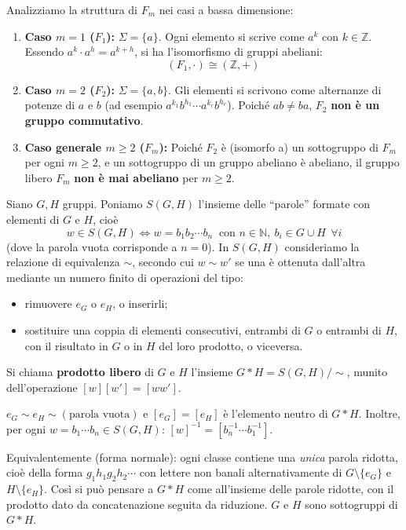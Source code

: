 \begin{observacion}
Analizziamo la struttura di $F_m$ nei casi a bassa dimensione:
\begin{enumerate}
    \item \textbf{Caso $m=1$ ($F_1$):} $\Sigma = \{a\}$. Ogni elemento si scrive come $a^k$ con $k \in \mathbb{Z}$.
    Essendo $a^k \cdot a^h = a^{k+h}$, si ha l'isomorfismo di gruppi abeliani:
    \[
    (F_1, \cdot) \cong (\mathbb{Z}, +)
    \]
    
    \item \textbf{Caso $m=2$ ($F_2$):} $\Sigma = \{a, b\}$. Gli elementi si scrivono come alternanze di potenze di $a$ e $b$ (ad esempio $a^{k_1} b^{h_1} \cdots a^{k_r} b^{h_r}$).
    Poiché $ab \neq ba$, $F_2$ \textbf{non è un gruppo commutativo}.
    
    \item \textbf{Caso generale $m \geqslant 2$ ($F_m$):} Poich\'e $F_2$ \`e (isomorfo a) un sottogruppo di $F_m$ per ogni $m \geqslant 2$, e un sottogruppo di un gruppo abeliano \`e abeliano, il gruppo libero $F_m$ \textbf{non è mai abeliano} per $m \geqslant 2$.
\end{enumerate}
\end{observacion}

\vspace{1.5em}


\begin{definicion}
Siano $G, H$ gruppi. Poniamo $S(G,H)$ l'insieme delle ``parole'' formate con elementi di $G$ e $H$, cio\`e
\[
w \in S(G,H) \iff w = b_1 b_2 \cdots b_n \ \text{ con } n \in \mathbb{N},\ b_i \in G \cup H \ \ \forall i
\]
(dove la parola vuota corrisponde a $n = 0$). In $S(G,H)$ consideriamo la relazione di equivalenza $\sim$, secondo cui $w \sim w'$ se una \`e ottenuta dall'altra mediante un numero finito di operazioni del tipo:
\begin{itemize}
    \item rimuovere $e_G$ o $e_H$, o inserirli;
    \item sostituire una coppia di elementi consecutivi, entrambi di $G$ o entrambi di $H$, con il risultato in $G$ o in $H$ del loro prodotto, o viceversa.
\end{itemize}
Si chiama \textbf{prodotto libero} di $G$ e $H$ l'insieme $G * H = S(G,H)/\!\sim$, munito dell'operazione $[w][w'] = [ww']$.
\end{definicion}

\begin{observacion}
$e_G \sim e_H \sim (\text{parola vuota})$ e $[e_G] = [e_H]$ \`e l'elemento neutro di $G * H$. Inoltre, per ogni $w = b_1 \cdots b_n \in S(G,H)$: $[w]^{-1} = [b_n^{-1} \cdots b_1^{-1}]$.

Equivalentemente (forma normale): ogni classe contiene una \emph{unica} parola ridotta, cio\`e della forma $g_1 h_1 g_2 h_2 \cdots$ con lettere non banali alternativamente di $G \setminus \{e_G\}$ e $H \setminus \{e_H\}$. Cos\`i si pu\`o pensare a $G * H$ come all'insieme delle parole ridotte, con il prodotto dato da concatenazione seguita da riduzione. $G$ e $H$ sono sottogruppi di $G * H$.
\end{observacion}

